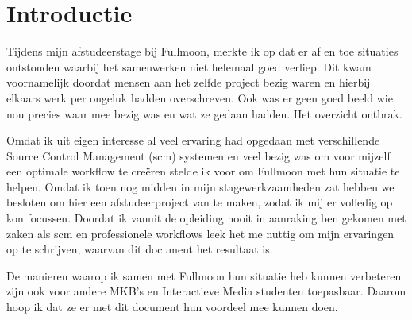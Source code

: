 \setcounter{chapter}{0}
\chapter{Introductie}
  
Tijdens mijn afstudeerstage bij Fullmoon, merkte ik op dat er af en toe situaties ontstonden waarbij het samenwerken niet helemaal goed verliep. Dit kwam voornamelijk doordat mensen aan het zelfde project bezig waren en hierbij elkaars werk per ongeluk hadden overschreven. Ook was er geen goed beeld wie nou precies waar mee bezig was en wat ze gedaan hadden. Het overzicht ontbrak.
  
Omdat ik uit eigen interesse al veel ervaring had opgedaan met verschillende Source Control Management ({\sc scm}) systemen en veel bezig was om voor mijzelf een optimale workflow te creëren stelde ik voor om Fullmoon met hun situatie te helpen. Omdat ik toen nog midden in mijn stagewerkzaamheden zat hebben we besloten om hier een afstudeerproject van te maken, zodat ik mij er volledig op kon focussen. Doordat ik vanuit de opleiding nooit in aanraking ben gekomen met zaken als {\sc scm} en professionele workflows leek het me nuttig om mijn ervaringen op te schrijven, waarvan dit document het resultaat is.

De manieren waarop ik samen met Fullmoon hun situatie heb kunnen verbeteren zijn ook voor andere MKB's en Interactieve Media studenten toepasbaar. Daarom hoop ik dat ze er met dit document hun voordeel mee kunnen doen.
